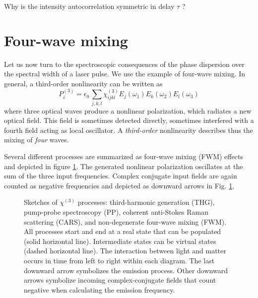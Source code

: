 \begin{questions}
\item Why is the intensity autocorrelation symmetric in delay $\tau$ ?
\end{questions}



		
\section{Four-wave mixing}

Let us now turn to the spectroscopic consequences of the phase dispersion over the spectral width of a laser pulse. We use the example of four-wave mixing. In general, a third-order nonlinearity can be written as
\begin{equation}
  P^{(3)}_i = \epsilon_0 \, 
    \sum_{j,k,l} \chi^{(3)}_{ijkl} E_j(\omega_1) E_k(\omega_2) E_l(\omega_3)  
\end{equation}		
where three optical waves produce a nonlinear polarization, which radiates a new optical field. This field is sometimes detected directly, sometimes interfered with  a fourth field acting as local oscillator. A \emph{third-order} nonlinearity describes thus the mixing of \emph{four} waves.
		
		
Several different processes are 	summarized as four-wave mixing (FWM) effects and depicted in figure \ref{fig:fwm_processes}.  The generated nonlinear polarization oscillates at the sum of the three input frequencies. Complex conjugate input fields are again counted as negative frequencies and depicted as downward arrows in Fig. \ref{fig:fwm_processes}.
	
\begin{figure}

\caption{Sketches of  $\chi^{(3)}$ processes:
%
third-harmonic generation (THG), pump-probe spectroscopy (PP), coherent anti-Stokes Raman scattering (CARS), and  non-degenerate four-wave mixing (FWM).
%
 All processes start and end at a real state  that can be populated (solid horizontal line). Intermediate states can be virtual states (dashed horizontal line). The interaction between light and matter occurs in time from left to right within each diagram. The last downward arrow symbolizes the emission process. Other downward  arrows symbolize incoming complex-conjugate fields that count negative when calculating the emission frequency.
\label{fig:fwm_processes}}
\end{figure}

